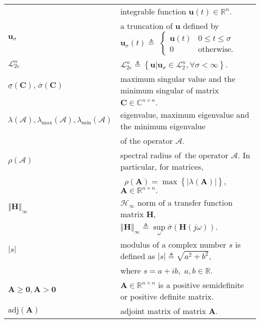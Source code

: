 \begin{table} [H]
\begin{tabular}{ll}
		& integrable function
		$\mathbf{u}\left(t\right)\in\mathbb{R}^{n}$.\\
		$\mathbf{u}_{\sigma}$ &   a truncation of $\mathbf{u}$ defined by $\mathbf{u}_{\sigma}\left(t\right)\triangleq$ $\begin{cases}
		\mathbf{u}\left(t\right) & 0\leqslant t\leqslant\sigma\\
		0 & \text{otherwise}.
		\end{cases}$\\
		$\mathcal{L}_{2e}^{n}$  & $\mathcal{L}_{2e}^{n}\triangleq\left\{ \mathbf{u}|\mathbf{u}_{\sigma}\in\mathcal{L}_{2}^{n},\forall\sigma<\infty\right\}$. \\
		${\underline{\sigma}\left(\mathbf{C}\right)}$, ${\overline{\sigma}\left(\mathbf{C}\right)}$ & maximum singular value and the minimum singular of matrix \\
		&  $\mathbf{C}\in%
		\mathbb{C}
		^{n\times n}.$ \\
		$\lambda \left(  \mathcal{A}\right)  ,\lambda_{\max}\left(  \mathcal{A}\right)
		,\lambda_{\min}\left(  \mathcal{A}\right)  $ & eigenvalue, maximum
		eigenvalue and the minimum eigenvalue \\
		& of the operator $\mathcal{A}.$ \\
		$\rho \left(  \mathcal{A}\right)  $ & spectral radius of\ the operator
		$\mathcal{A}.$ In particular, for matrices, \\
		& \ $\rho \left(  \mathbf{A}\right)
		=\max \left \{  \left \vert \lambda \left(  \mathbf{A}\right)  \right \vert
		\right \}  ,$ $\mathbf{A}\in%
		\mathbb{R}
		^{n\times n}.$ \\
		$\left\Vert \mathbf{H}\right\Vert _{\infty}$ & $\mathcal{H}_{\infty}$ norm of a transfer function matrix $\mathbf{H}$, \\
		& $\left\Vert \mathbf{H}\right\Vert _{\infty}\triangleq\underset{\omega}{\sup}\bar{\sigma}\left(\mathbf{H}\left(j\omega\right)\right).$ \\
		$\left \vert s\right \vert $ & modulus of a complex number $s$ is defined as
		$\left \vert s\right \vert \triangleq \sqrt{a^{2}+b^{2}},$ \\
		& where $s=a+ib,$
		$a,b\in%
		\mathbb{R}.
		$\\
		$\mathbf{A}\geq \mathbf{0},\mathbf{A>0}$  & $\mathbf{A}\in%
		\mathbb{R}
		^{n\times n}$ is a positive semidefinite or positive definite matrix.\\
		$\textrm{adj}(\mathbf{A})$ &  adjoint matrix of matrix $\mathbf{A}.$
	\end{tabular}
\end{table}




